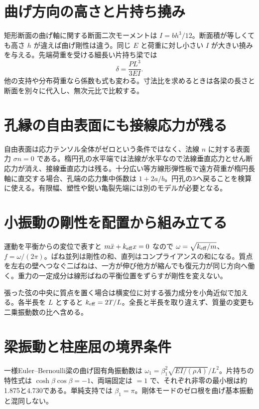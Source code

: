 \section{曲げ方向の高さと片持ち撓み}
\label{theory:analysis:section}
\label{theory:analysis:cantilever}
矩形断面の曲げ軸に関する断面二次モーメントは \(I=bh^3/12\)。断面積が等しくても高さ \(h\) が違えば曲げ剛性は違う。同じ \(E\) と荷重に対し小さい \(I\) が大きい撓みを与える。先端荷重を受ける細長い片持ち梁では
\[
 \delta=\frac{PL^3}{3EI}.
\]
他の支持や分布荷重なら係数も式も変わる。寸法比を求めるときは各梁の長さと断面を別々に代入し、無次元比で比較する。\cite{struct_mit_beam,analysis57_beam}

\section{孔縁の自由表面にも接線応力が残る}
\label{theory:analysis:inglis}
自由表面は応力テンソル全体がゼロという条件ではなく、法線 \(n\) に対する表面力 \(\sigma n=0\) である。楕円孔の水平端では法線が水平なので法線垂直応力とせん断応力が消え、接線垂直応力は残る。十分広い等方線形弾性板で遠方荷重が楕円長軸に直交する場合、孔端の応力集中係数は \(1+2a/b\)。円孔の3へ戻ることを検算に使える。有限幅、塑性や鋭い亀裂先端には別のモデルが必要となる。\cite{analysis57_inglis}

\section{小振動の剛性を配置から組み立てる}
\label{theory:analysis:spring}
\label{theory:analysis:springgravity}
\label{theory:analysis:stringmass}
運動を平衡からの変位で表すと \(m\ddot x+k_{\rm eff}x=0\) なので \(\omega=\sqrt{k_{\rm eff}/m}\)、\(f=\omega/(2\pi)\)。ばね並列は剛性の和、直列はコンプライアンスの和になる。質点を左右の壁へつなぐ二ばねは、一方が伸び他方が縮んでも復元力が同じ方向へ働く。重力の一定成分は線形ばねの平衡位置をずらすが剛性を変えない。

張った弦の中央に質点を置く場合は横変位に対する張力成分を小角近似で加える。各半長を \(L\) とすると \(k_{\rm eff}=2T/L\)。全長と半長を取り違えず、質量の変更も二乗振動数の比へ含める。\cite{analysis57_shm}

\section{梁振動と柱座屈の境界条件}
\label{theory:analysis:beamfreq}
\label{theory:analysis:buckling}
一様Euler--Bernoulli梁の曲げ固有角振動数は \(\omega_1=\beta_1^2\sqrt{EI/(\rho A)}/L^2\)。片持ちの特性式は \(\cosh\beta\cos\beta=-1\)、両端固定は \(=1\) で、それぞれ非零の最小根は約1.875と4.730である。単純支持では \(\beta_1=\pi\)。剛体モードのゼロ根を曲げ基本振動と混同しない。\cite{analysis57_beam}

